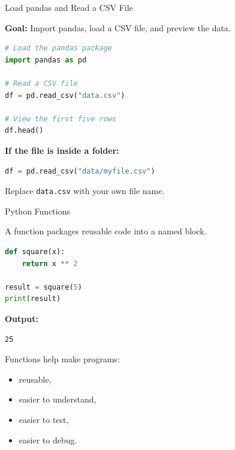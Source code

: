 \documentclass[aspectratio=43,10pt]{beamer}
\begin{document}
\begin{frame}[fragile]{Load pandas and Read a CSV File}

\textbf{Goal:} Import pandas, load a CSV file, and preview the data.

\vspace{0.4em}

\begin{lstlisting}[language=Python]
# Load the pandas package
import pandas as pd

# Read a CSV file
df = pd.read_csv("data.csv")

# View the first five rows
df.head()
\end{lstlisting}

\vspace{0.4em}

\textbf{If the file is inside a folder:}

\begin{lstlisting}[language=Python]
df = pd.read_csv("data/myfile.csv")
\end{lstlisting}

\vspace{0.3em}

Replace \texttt{data.csv} with your own file name.

\end{frame}

\begin{frame}[fragile]{Python Functions}

A function packages reusable code into a named block.

\begin{lstlisting}[language=Python]
def square(x):
    return x ** 2

result = square(5)
print(result)
\end{lstlisting}

\textbf{Output:}

\begin{lstlisting}
25
\end{lstlisting}

Functions help make programs:

\begin{itemize}
  \item reusable,
  \item easier to understand,
  \item easier to test,
  \item easier to debug.
\end{itemize}

\end{frame}
\end{document}
